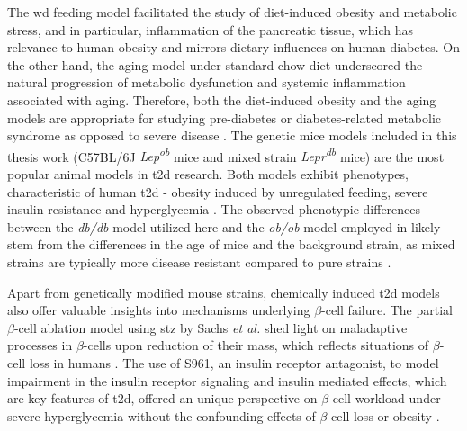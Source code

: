 \par The \gls{wd} feeding model facilitated the study of diet-induced obesity and metabolic stress, and in particular, inflammation of the pancreatic tissue, which has relevance to human obesity and mirrors dietary influences on human diabetes. On the other hand, the aging model under standard chow diet underscored the natural progression of metabolic dysfunction and systemic inflammation associated with aging. Therefore, both the diet-induced obesity and the aging models are appropriate for studying pre-diabetes or diabetes-related metabolic syndrome as opposed to severe disease \textbf{\cite{the_jackson_laboratory_choosing_nodate}}. The genetic mice models included in this thesis work (C57BL/6J \textit{Lep\textsuperscript{ob}} mice and mixed strain \textit{Lepr\textsuperscript{db}} mice) are the most popular animal models in \gls{t2d} research. Both models exhibit phenotypes, characteristic of human \gls{t2d} - obesity induced by unregulated feeding, severe insulin resistance and hyperglycemia \textbf{\cite{the_jackson_laboratory_choosing_nodate}}. The observed phenotypic differences between the \textit{db/db} model utilized here and the \textit{ob/ob} model employed in \textbf{\cite{chung_advances_2021}} likely stem from the differences in the age of mice and the background strain, as mixed strains are typically more disease resistant compared to pure strains \textbf{\cite{birchler_unraveling_2006}}.\\

\par Apart from genetically modified mouse strains, chemically induced \gls{t2d} models also offer valuable insights into mechanisms underlying $\beta$-cell failure. The partial $\beta$-cell ablation model using \gls{stz} by Sachs \textit{et al.} \textbf{\cite{sachs_targeted_2020}} shed light on maladaptive processes in $\beta$-cells upon reduction of their mass, which reflects situations of $\beta$-cell loss in humans \textbf{\cite{prentki_islet_2006}}. The use of S961, an insulin receptor antagonist, to model impairment in the insulin receptor signaling and insulin mediated effects, which are key features of \gls{t2d}, offered an unique perspective on $\beta$-cell workload under severe hyperglycemia without the confounding effects of $\beta$-cell loss or obesity \textbf{\cite{vikram_inhibition_2011}}.\\

